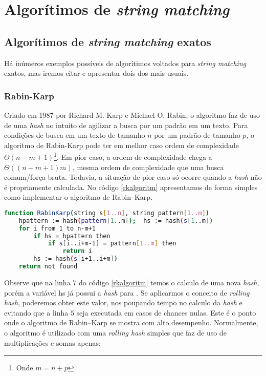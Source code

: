 \section{Algorítimos de  \textit{string matching}} %
\label{sec:algoritimos_de_textit}

\subsection{Algorítimos de \textit{string matching} exatos} %
\label{sub:algoritimos_de_textit}

Há inúmeros exemplos possíveis de algorítimos voltados para \textit{string matching} exatos, mas iremos citar e apresentar dois dos mais usuais.

\subsubsection*{Rabin-Karp} %
\label{ssub:rabin_karp}

Criado  em 1987  por  Richard M. Karp e Michael O. Rabin, o algoritmo faz de uso de uma \textit{hash} no intuito de agilizar a busca por um padrão em um texto. Para condições de busca em um texto de tamanho $n$ por um padrão de tamanho $p$, o algoritmo de Rabin-Karp pode ter em melhor caso ordem de complexidade $\Theta(n-m+1)$\cite{paulo2015algoritmos}\footnote{Onde $m=n+p$}. Em pior caso, a ordem de complexidade chega a $\Theta((n-m+1)m)$, mesma ordem de complexidade que uma busca comum/força bruta\cite{paulo2015algoritmos}. Todavia, a situação de pior caso só ocorre quando a \textit{hash} não é propriamente calculada. No código \ref{rkalgoritm} apresentamos de forma simples como implementar o algoritmo de Rabin–Karp.

\begin{lstlisting}[language=Bash,label=rkalgoritm,caption={Algoritmo de Rabin–Karp}]
function RabinKarp(string s[1..n], string pattern[1..m])
	hpattern := hash(pattern[1..m]);  hs := hash(s[1..m])
	for i from 1 to n-m+1
		if hs = hpattern then
			if s[i..i+m-1] = pattern[1..m] then
				return i
		hs := hash(s[i+1..i+m])
	return not found
\end{lstlisting}

Observe que na linha $7$ do código \ref{rkalgoritm} temos o calculo de uma nova \textit{hash}, porém a variável {\code hs} já possui a \textit{hash} para {}. Se aplicarmos o conceito de \textit{rolling hash}, poderemos obter este valor, nos poupando tempo no calculo da \textit{hash} e evitando que a linha $5$ seja executada em casos de chances nulas. Este é o ponto onde o algoritmo de Rabin–Karp se mostra com alto desempenho. Normalmente, o algoritmo é utilizado com uma \textit{rolling hash} simples que faz de uso  de multiplicações e somas apenas:

